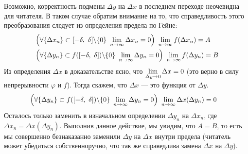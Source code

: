 \begin{anote}
	Возможно, корректность подмены
	$\Delta y$ на $\Delta x$ в последнем переходе
	неочевидна для читателя. В таком случае обратим внимание
	на то, что справедливость этого преобразования следует
	из определения предела по Гейне:
	\begin{align*}
		& \left(\forall \{\Delta x_n\}
		\subset [- \delta,\ \delta] \backslash \{0\}\ \lim\limits_{n \to \infty} \Delta x_n = 0\right)
		\ \lim\limits_{n \to \infty} f(\Delta x_n) = A\\
		& \left(\forall \{\Delta y_n\}
		\subset f([- \delta,\ \delta]) \backslash \{0\}\ \lim\limits_{n \to \infty} \Delta y_n = 0\right)
		\ \lim\limits_{n \to \infty} f(\Delta y_n) = B
	\end{align*}
	Из определения $\Delta x$ в доказательстве ясно, что
	$\lim\limits_{\Delta y \to 0} \Delta x = 0$ (это верно в силу непрерывности
	$\varphi$ и $f$). Тогда скажем, что $\Delta x$ --- это функция от
	$\Delta y$.
	\begin{align*}
		& \left(\forall \{\Delta y_n\}
		\subset f([- \delta,\ \delta]) \bs \{0\}\ 
		\liml_{n \to \infty} \Delta y_n = 0\right)
		\ \liml_{n \to \infty} \Delta x(\Delta y_n) = 0
	\end{align*}
	Осталось только заменить в изначальном определении $\Delta y_n$
	на $\Delta x_n$, где $\Delta x_n = \Delta x(\Delta y_n)$.
	Выполнив данное действие, мы увидим, что $A = B$, то есть мы
	совершенно безнаказанно заменили $\Delta y$ на $\Delta x$
	внутри предела (читатель может убедиться собственноручно,
	что так же справедлива замена $\Delta x$ на $\Delta y$).
\end{anote}